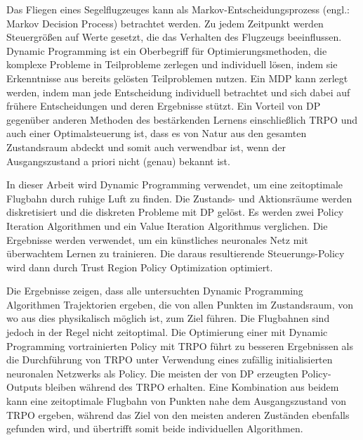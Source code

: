 Das Fliegen eines Segelflugzeuges kann als Markov-Entscheidungsprozess (engl.: Markov Decision Process) betrachtet werden. Zu jedem Zeitpunkt werden Steuergrößen auf Werte gesetzt, die das Verhalten des Flugzeugs beeinflussen. Dynamic Programming ist ein Oberbegriff für Optimierungsmethoden, die komplexe Probleme in Teilprobleme zerlegen und individuell lösen, indem sie Erkenntnisse aus bereits gelösten Teilproblemen nutzen. Ein MDP kann zerlegt werden, indem man jede Entscheidung individuell betrachtet und sich dabei auf frühere Entscheidungen und deren Ergebnisse stützt. Ein Vorteil von DP gegenüber anderen Methoden des bestärkenden Lernens einschließlich TRPO und auch einer Optimalsteuerung ist, dass es von Natur aus den gesamten Zustandsraum abdeckt und somit auch verwendbar ist, wenn der Ausgangszustand a priori nicht (genau) bekannt ist.

In dieser Arbeit wird Dynamic Programming verwendet, um eine zeitoptimale Flugbahn durch ruhige Luft zu finden. Die Zustands- und Aktionsräume werden diskretisiert und die diskreten Probleme mit DP gelöst. Es werden zwei Policy Iteration Algorithmen und ein Value Iteration Algorithmus verglichen. Die Ergebnisse werden verwendet, um ein künstliches neuronales Netz mit überwachtem Lernen zu trainieren. Die daraus resultierende Steuerungs-Policy wird dann durch Trust Region Policy Optimization optimiert.

Die Ergebnisse zeigen, dass alle untersuchten Dynamic Programming Algorithmen Trajektorien ergeben, die von allen Punkten im Zustandsraum, von wo aus dies physikalisch möglich ist, zum Ziel führen. Die Flugbahnen sind jedoch in der Regel nicht zeitoptimal. Die Optimierung einer mit Dynamic Programming vortrainierten Policy mit TRPO führt zu besseren Ergebnissen als die Durchführung von TRPO unter Verwendung eines zufällig initialisierten neuronalen Netzwerks als Policy. Die meisten der von DP erzeugten Policy-Outputs bleiben während des TRPO erhalten. Eine Kombination aus beidem kann eine zeitoptimale Flugbahn von Punkten nahe dem Ausgangszustand von TRPO ergeben, während das Ziel von den meisten anderen Zuständen ebenfalls gefunden wird, und übertrifft somit beide individuellen Algorithmen.

